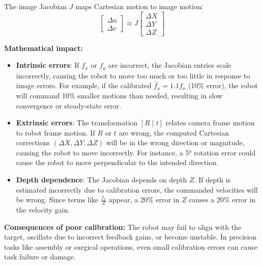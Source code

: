 \documentclass[11pt]{article}
\begin{document}
The image Jacobian $J$ maps Cartesian motion to image motion:
\[
\begin{bmatrix} \Delta u \\ \Delta v \end{bmatrix} \approx J \begin{bmatrix} \Delta X \\ \Delta Y \\ \Delta Z \end{bmatrix}
\]

\textbf{Mathematical impact:}

\begin{itemize}
    \item \textbf{Intrinsic errors}: If $f_x$ or $f_y$ are incorrect, the Jacobian entries scale incorrectly, causing the robot to move too much or too little in response to image errors. For example, if the calibrated $\hat{f}_x = 1.1 f_x$ (10\% error), the robot will command 10\% smaller motions than needed, resulting in slow convergence or steady-state error.
    
    \item \textbf{Extrinsic errors}: The transformation $[R \mid t]$ relates camera frame motion to robot frame motion. If $R$ or $t$ are wrong, the computed Cartesian corrections $(\Delta X, \Delta Y, \Delta Z)$ will be in the wrong direction or magnitude, causing the robot to move incorrectly. For instance, a 5° rotation error could cause the robot to move perpendicular to the intended direction.
    
    \item \textbf{Depth dependence}: The Jacobian depends on depth $Z$. If depth is estimated incorrectly due to calibration errors, the commanded velocities will be wrong. Since terms like $\frac{f_x}{Z}$ appear, a 20\% error in $Z$ causes a 20\% error in the velocity gain.
\end{itemize}

\textbf{Consequences of poor calibration:} The robot may fail to align with the target, oscillate due to incorrect feedback gains, or become unstable. In precision tasks like assembly or surgical operations, even small calibration errors can cause task failure or damage.
\end{document}
